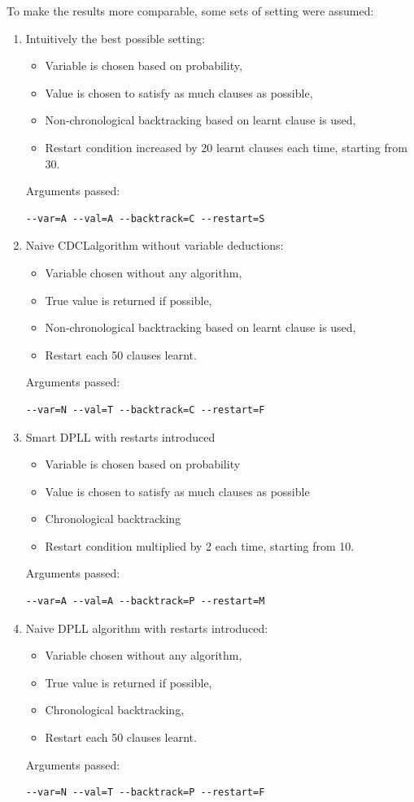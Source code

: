 \documentclass[12pt,english,pdflatex]{aghdpl}
\begin{document}
To make the results more comparable, some sets of setting were assumed:
\begin{enumerate}
\item Intuitively the best possible setting:
\begin{itemize}
\item Variable is chosen based on probability,
\item Value is chosen to satisfy as much clauses as possible,
\item Non-chronological backtracking based on learnt clause is used,
\item Restart condition increased by 20 learnt clauses each time, starting from 30.
\end{itemize}
Arguments passed:
\begin{lstlisting}
--var=A --val=A --backtrack=C --restart=S
\end{lstlisting}

\item Naive CDCLalgorithm  without variable deductions:
\begin{itemize}
\item Variable chosen without any algorithm,
\item True value is returned if possible,
\item Non-chronological backtracking based on learnt clause is used,
\item Restart each 50 clauses learnt.
\end{itemize}
Arguments passed:
\begin{lstlisting}
--var=N --val=T --backtrack=C --restart=F
\end{lstlisting}

\item Smart DPLL with restarts introduced
\begin{itemize}
\item Variable is chosen based on probability
\item Value is chosen to satisfy as much clauses as possible
\item Chronological backtracking
\item Restart condition multiplied by 2 each time, starting from 10.
\end{itemize}
Arguments passed:
\begin{lstlisting}
--var=A --val=A --backtrack=P --restart=M
\end{lstlisting}

\item Naive DPLL algorithm with restarts introduced:
\begin{itemize}
\item Variable chosen without any algorithm,
\item True value is returned if possible,
\item Chronological backtracking,
\item Restart each 50 clauses learnt.
\end{itemize}
Arguments passed:
\begin{lstlisting}
--var=N --val=T --backtrack=P --restart=F
\end{lstlisting}


\end{enumerate}
\end{document}
